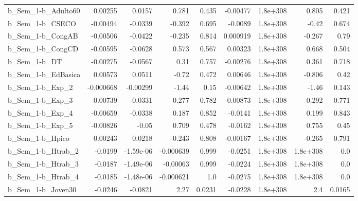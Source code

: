 \begin{tabular}{lrrrrrrrr}
b\_Sem\_1-b\_Adulto60           &     0.00255 &       0.0157 &     0.781 &    0.435 &   -0.00477 &    1.8e+308 &        0.805 &         0.421 \\
b\_Sem\_1-b\_CSECO              &    -0.00494 &      -0.0339 &    -0.392 &    0.695 &    -0.0089 &    1.8e+308 &        -0.42 &         0.674 \\
b\_Sem\_1-b\_CongAB             &    -0.00506 &      -0.0422 &    -0.235 &    0.814 &   0.000919 &    1.8e+308 &       -0.267 &          0.79 \\
b\_Sem\_1-b\_CongCD             &    -0.00595 &      -0.0628 &     0.573 &    0.567 &    0.00323 &    1.8e+308 &        0.668 &         0.504 \\
b\_Sem\_1-b\_DT                 &    -0.00275 &      -0.0567 &      0.31 &    0.757 &   -0.00276 &    1.8e+308 &        0.361 &         0.718 \\
b\_Sem\_1-b\_EdBasica           &     0.00573 &       0.0511 &     -0.72 &    0.472 &    0.00646 &    1.8e+308 &       -0.806 &          0.42 \\
b\_Sem\_1-b\_Exp\_2              &   -0.000668 &     -0.00299 &     -1.44 &     0.15 &   -0.00642 &    1.8e+308 &        -1.46 &         0.143 \\
b\_Sem\_1-b\_Exp\_3              &    -0.00739 &      -0.0331 &     0.277 &    0.782 &   -0.00873 &    1.8e+308 &        0.292 &         0.771 \\
b\_Sem\_1-b\_Exp\_4              &    -0.00659 &      -0.0338 &     0.187 &    0.852 &    -0.0141 &    1.8e+308 &        0.199 &         0.843 \\
b\_Sem\_1-b\_Exp\_5              &    -0.00826 &        -0.05 &     0.709 &    0.478 &    -0.0162 &    1.8e+308 &        0.755 &          0.45 \\
b\_Sem\_1-b\_Hpico              &     0.00243 &       0.0218 &    -0.243 &    0.808 &   -0.00167 &    1.8e+308 &       -0.265 &         0.791 \\
b\_Sem\_1-b\_Htrab\_2            &     -0.0199 &    -1.59e-06 & -0.000639 &    0.999 &    -0.0251 &    1.8e+308 &     1.8e+308 &           0.0 \\
b\_Sem\_1-b\_Htrab\_3            &     -0.0187 &    -1.49e-06 &  -0.00063 &    0.999 &    -0.0224 &    1.8e+308 &     1.8e+308 &           0.0 \\
b\_Sem\_1-b\_Htrab\_4            &     -0.0185 &    -1.48e-06 & -0.000621 &      1.0 &    -0.0275 &    1.8e+308 &     1.8e+308 &           0.0 \\
b\_Sem\_1-b\_Joven30            &     -0.0246 &      -0.0821 &      2.27 &   0.0231 &    -0.0228 &    1.8e+308 &          2.4 &        0.0165 \\

\end{tabular}
